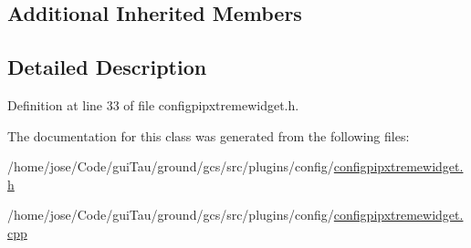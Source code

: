 \subsection*{Additional Inherited Members}


\subsection{Detailed Description}


Definition at line 33 of file configpipxtremewidget.\-h.



The documentation for this class was generated from the following files\-:\begin{DoxyCompactItemize}
\item 
/home/jose/\-Code/gui\-Tau/ground/gcs/src/plugins/config/\hyperlink{configpipxtremewidget_8h}{configpipxtremewidget.\-h}\item 
/home/jose/\-Code/gui\-Tau/ground/gcs/src/plugins/config/\hyperlink{configpipxtremewidget_8cpp}{configpipxtremewidget.\-cpp}\end{DoxyCompactItemize}
